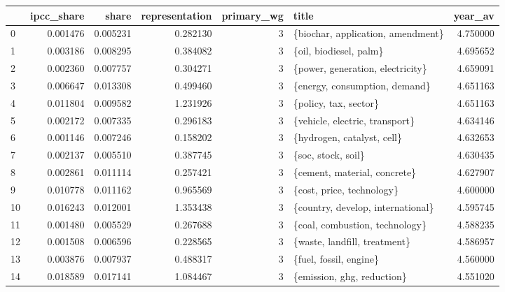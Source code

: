\begin{tabular}{lrrrrlr}
\toprule
{} &  ipcc\_share &     share &  representation &  primary\_wg &                                   title &   year\_av \\
\midrule
0  &    0.001476 &  0.005231 &        0.282130 &           3 &       \{biochar, application, amendment\} &  4.750000 \\
1  &    0.003186 &  0.008295 &        0.384082 &           3 &                  \{oil, biodiesel, palm\} &  4.695652 \\
2  &    0.002360 &  0.007757 &        0.304271 &           3 &        \{power, generation, electricity\} &  4.659091 \\
3  &    0.006647 &  0.013308 &        0.499460 &           3 &           \{energy, consumption, demand\} &  4.651163 \\
4  &    0.011804 &  0.009582 &        1.231926 &           3 &                   \{policy, tax, sector\} &  4.651163 \\
5  &    0.002172 &  0.007335 &        0.296183 &           3 &          \{vehicle, electric, transport\} &  4.634146 \\
6  &    0.001146 &  0.007246 &        0.158202 &           3 &              \{hydrogen, catalyst, cell\} &  4.632653 \\
7  &    0.002137 &  0.005510 &        0.387745 &           3 &                      \{soc, stock, soil\} &  4.630435 \\
8  &    0.002861 &  0.011114 &        0.257421 &           3 &            \{cement, material, concrete\} &  4.627907 \\
9  &    0.010778 &  0.011162 &        0.965569 &           3 &               \{cost, price, technology\} &  4.600000 \\
10 &    0.016243 &  0.012001 &        1.353438 &           3 &       \{country, develop, international\} &  4.595745 \\
11 &    0.001480 &  0.005529 &        0.267688 &           3 &          \{coal, combustion, technology\} &  4.588235 \\
12 &    0.001508 &  0.006596 &        0.228565 &           3 &            \{waste, landfill, treatment\} &  4.586957 \\
13 &    0.003876 &  0.007937 &        0.488317 &           3 &                  \{fuel, fossil, engine\} &  4.560000 \\
14 &    0.018589 &  0.017141 &        1.084467 &           3 &              \{emission, ghg, reduction\} &  4.551020 \\

\end{tabular}
